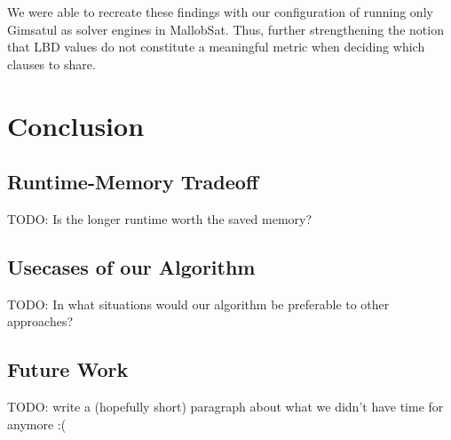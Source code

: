 \documentclass[12pt,a4paper,twoside]{scrartcl}
\numberwithin{equation}{section}
\begin{document}
We were able to recreate these findings with our configuration of running only Gimsatul as solver engines in MallobSat. Thus, further strengthening the notion that LBD values do not constitute a meaningful metric when deciding which clauses to share.


\newpage
\section{Conclusion}

\subsection{Runtime-Memory Tradeoff}

TODO: Is the longer runtime worth the saved memory?

\subsection{Usecases of our Algorithm}

TODO: In what situations would our algorithm be preferable to other approaches?

\subsection{Future Work}

TODO: write a (hopefully short) paragraph about what we didn't have time for anymore :(


\clearpage


\appendix
\end{document}
